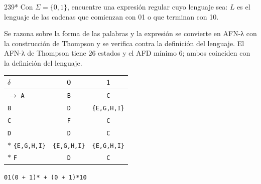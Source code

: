 \documentclass[11pt]{article}
\begin{document}
\begin{ejercicio}{239}{*}
Con $\Sigma = \{0, 1\}$, encuentre una expresión regular cuyo lenguaje sea: $L$ es el lenguaje de las cadenas que comienzan con 01 o que terminan con 10.
\end{ejercicio}
\proc Se razona sobre la forma de las palabras y la expresión se convierte en AFN-λ con la construcción de Thompson y se verifica contra la definición del lenguaje. El AFN-λ de Thompson tiene 26 estados y el AFD mínimo 6; ambos coinciden con la definición del lenguaje.
\begin{center}\small\begin{tabular}{lcc}\toprule
$\delta$ & 0 & 1 \\\midrule
$\to$ \texttt{A} & \texttt{B} & \texttt{C} \\
 \texttt{B} & \texttt{D} & \texttt{\{E,G,H,I\}} \\
 \texttt{C} & \texttt{F} & \texttt{C} \\
 \texttt{D} & \texttt{D} & \texttt{C} \\
$*$ \texttt{\{E,G,H,I\}} & \texttt{\{E,G,H,I\}} & \texttt{\{E,G,H,I\}} \\
$*$ \texttt{F} & \texttt{D} & \texttt{C} \\
\bottomrule\end{tabular}\end{center}

\resp \texttt{01(0 + 1)* + (0 + 1)*10}
\end{document}
